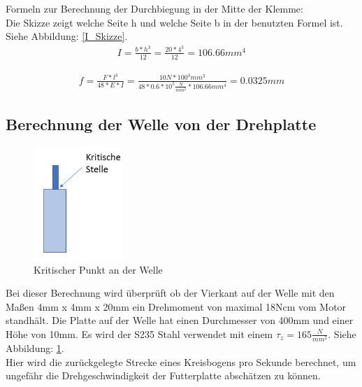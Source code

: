 Formeln zur Berechnung der Durchbiegung in der Mitte der Klemme: \\

Die Skizze zeigt welche Seite h und welche Seite b in der benutzten Formel ist. Siehe Abbildung: \ref{I_Skizze}.
\begin{align*}
I = \frac{b*h^{3}}{12} = \frac{20*4^{3}}{12} = 106.66mm^{4} 
\end{align*}

\begin{align*}
f=\frac{ F*l^{ 3 } }{ 48*E*I} = \frac{10N*100^{3}mm^{3}}{48*0.6*10^{5}\frac{N}{mm^{2}}*106.66mm^{4}} = 0.0325mm
\end{align*}
\newpage
\subsection{Berechnung der Welle von der Drehplatte}

\begin{figure}
\vspace{-20pt}
  \begin{center}
    \includegraphics[width=0.3\textwidth]{Bilder/Powerpoint/Torsionsmoment}
  \end{center}
  \caption{Kritischer Punkt an der Welle}
  \label{Torsionsmoment}
  \vspace{-20pt}
\end{figure}

Bei dieser Berechnung wird überprüft ob der Vierkant auf der Welle mit den Maßen 4mm x 4mm x 20mm ein Drehmoment von maximal 18Ncm vom Motor standhält. Die Platte auf der Welle hat einen Durchmesser von 400mm und einer Höhe von 10mm. Es wird der S235 Stahl verwendet mit einem $\tau_z=165\frac{N}{mm^{2}}$. Siehe Abbildung: \ref{Torsionsmoment}.\\

Hier wird die zurückgelegte Strecke eines Kreisbogens pro Sekunde berechnet, um ungefähr die Drehgeschwindigkeit der Futterplatte abschätzen zu können.

